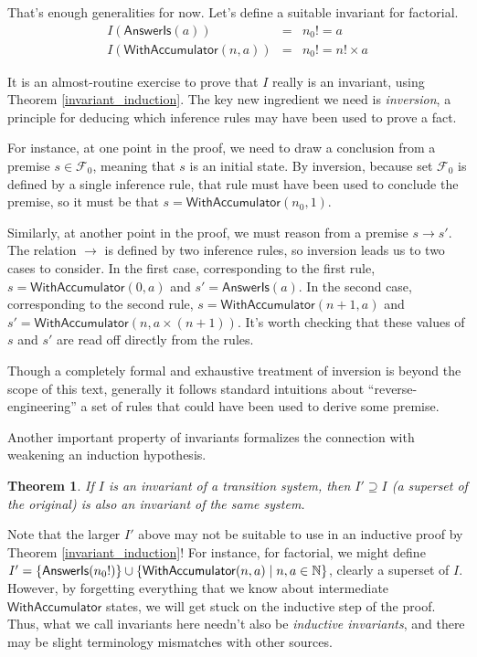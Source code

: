 \documentclass{amsbook}
\newtheorem{theorem}{Theorem}[chapter]
\theoremstyle{definition}
\theoremstyle{remark}
\numberwithin{section}{chapter}
\numberwithin{equation}{chapter}
\begin{document}
That's enough generalities for now.
Let's define a suitable invariant for factorial.
\invariants
\begin{eqnarray*}
  I(\mathsf{AnswerIs}(a)) &=& n_0! = a \\
  I(\mathsf{WithAccumulator}(n, a)) &=& n_0! = n! \times a
\end{eqnarray*}

It is an almost-routine exercise to prove that $I$ really is an invariant, using Theorem \ref{invariant_induction}.
The key new ingredient we need is \emph{inversion}, a principle for deducing which inference rules may have been used to prove a fact.

For instance, at one point in the proof, we need to draw a conclusion from a premise $s \in \mathcal F_0$, meaning that $s$ is an initial state.
By inversion, because set $\mathcal F_0$ is defined by a single inference rule, that rule must have been used to conclude the premise, so it must be that $s = \mathsf{WithAccumulator}(n_0, 1)$.

Similarly, at another point in the proof, we must reason from a premise $s \to s'$.
The relation $\to$ is defined by two inference rules, so inversion leads us to two cases to consider.
In the first case, corresponding to the first rule, $s = \mathsf{WithAccumulator}(0, a)$ and $s' = \mathsf{AnswerIs}(a)$.
In the second case, corresponding to the second rule, $s = \mathsf{WithAccumulator}(n+1, a)$ and $s' = \mathsf{WithAccumulator}(n, a \times (n+1))$.
It's worth checking that these values of $s$ and $s'$ are read off directly from the rules.

Though a completely formal and exhaustive treatment of inversion is beyond the scope of this text, generally it follows standard intuitions about ``reverse-engineering'' a set of rules that could have been used to derive some premise.

Another important property of invariants formalizes the connection with weakening an induction hypothesis.

\begin{theorem}\label{invariant_weaken}
  If $I$ is an invariant of a transition system, then $I' \supseteq I$ (a superset of the original) is also an invariant of the same system.
\end{theorem}

Note that the larger $I'$ above may not be suitable to use in an inductive proof by Theorem \ref{invariant_induction}!
For instance, for factorial, we might define $I' = \mathcal \{\mathsf{AnswerIs}(n_0!)\} \cup \{\mathsf{WithAccumulator}(n, a) \mid n, a \in \mathbb N\}$, clearly a superset of $I$.
However, by forgetting everything that we know about intermediate $\mathsf{WithAccumulator}$ states, we will get stuck on the inductive step of the proof.
Thus, what we call invariants here needn't also be \emph{inductive invariants}, and there may be slight terminology mismatches with other sources.
\end{document}
